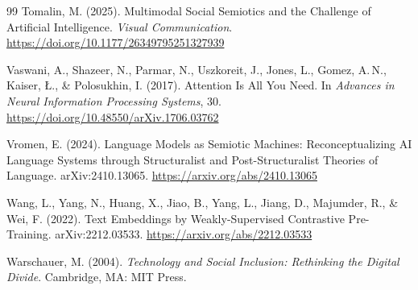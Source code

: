 \documentclass[12pt,a4paper]{article}
\begin{document}
\begin{thebibliography}{99}
Tomalin, M. (2025).
\newblock Multimodal Social Semiotics and the Challenge of Artificial Intelligence.
\newblock \emph{Visual Communication}.
\newblock \url{https://doi.org/10.1177/26349795251327939}

Vaswani, A., Shazeer, N., Parmar, N., Uszkoreit, J., Jones, L., Gomez, A.\,N.,
Kaiser, \L., \& Polosukhin, I. (2017).
\newblock Attention Is All You Need.
\newblock In \emph{Advances in Neural Information Processing Systems}, 30.
\newblock \url{https://doi.org/10.48550/arXiv.1706.03762}

Vromen, E. (2024).
\newblock Language Models as Semiotic Machines: Reconceptualizing AI Language
Systems through Structuralist and Post-Structuralist Theories of Language.
\newblock arXiv:2410.13065.
\newblock \url{https://arxiv.org/abs/2410.13065}

Wang, L., Yang, N., Huang, X., Jiao, B., Yang, L., Jiang, D., Majumder, R.,
\& Wei, F. (2022).
\newblock Text Embeddings by Weakly-Supervised Contrastive Pre-Training.
\newblock arXiv:2212.03533.
\newblock \url{https://arxiv.org/abs/2212.03533}

Warschauer, M. (2004).
\newblock \emph{Technology and Social Inclusion: Rethinking the Digital Divide}.
\newblock Cambridge, MA: MIT Press.

\end{thebibliography}
\end{document}
